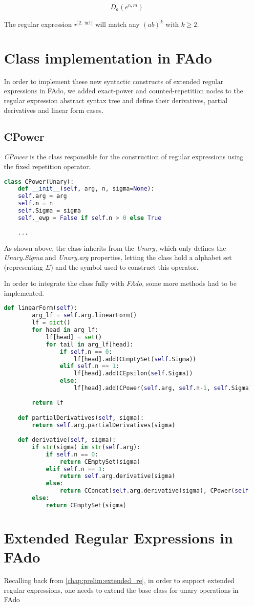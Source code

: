 \begin{align*}
	D_a(e^{n,m})
\end{align*}

The regular expression $r^{[2, \inf[}$ will match any $(ab)^k$ with $k \geq 2$.




\section{Class implementation in FAdo}
In order to implement these new syntactic constructs of extended regular expressions in FAdo, we added exact-power and counted-repetition nodes to the regular expression abstract syntax tree and define their derivatives, partial derivatives and linear form cases.

\subsection{CPower}
\textit{CPower} is the class responsible for the construction of regular expressions using the fixed repetition operator.

\begin{lstlisting}[language=Python]
class CPower(Unary):
	def __init__(self, arg, n, sigma=None):
	self.arg = arg
	self.n = n
	self.Sigma = sigma
	self._ewp = False if self.n > 0 else True
	
	...
\end{lstlisting}

As shown above, the class inherits from the \textit{Unary}, which only defines the \textit{Unary.Sigma} and \textit{Unary.arg} properties, letting the class hold a alphabet set (representing $\Sigma$) and the symbol used to construct this operator.

In order to integrate the class fully with \textit{FAdo}, some more methods had to be implemented.

\begin{lstlisting}[language=Python]
	def linearForm(self):
		arg_lf = self.arg.linearForm()
		lf = dict()
		for head in arg_lf:
			lf[head] = set()
			for tail in arg_lf[head]:
				if self.n == 0:
					lf[head].add(CEmptySet(self.Sigma))
				elif self.n == 1:
					lf[head].add(CEpsilon(self.Sigma))
				else:
					lf[head].add(CPower(self.arg, self.n-1, self.Sigma))
	
		return lf

	def partialDerivatives(self, sigma):
		return self.arg.partialDerivatives(sigma)
	
	def derivative(self, sigma):
		if str(sigma) in str(self.arg):
			if self.n == 0:
				return CEmptySet(sigma)
			elif self.n == 1:
				return self.arg.derivative(sigma)
			else:
				return CConcat(self.arg.derivative(sigma), CPower(self.arg, self.n-1, self.Sigma))
		else:
			return CEmptySet(sigma)
\end{lstlisting}



\section{Extended Regular Expressions in FAdo}
Recalling back from \ref{chap:prelim:extended_re}, in order to support extended regular expressions, one needs to extend the base class for unary operations in FAdo